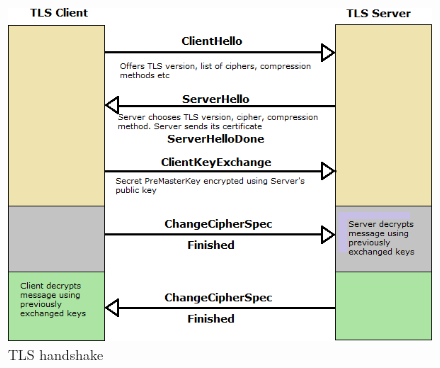 
\begin{figure}
  \includegraphics[width=\textwidth]{images/tls-handshake.png}
  \caption{TLS handshake}
\end{figure}
